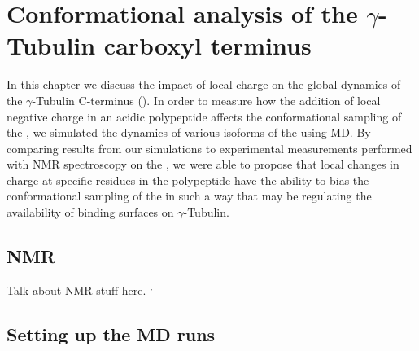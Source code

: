 \chapter{Conformational analysis of the $\gamma$-Tubulin carboxyl terminus}

In this chapter we discuss the impact of local charge on the global dynamics of the $\gamma$-Tubulin C-terminus (\gct). In order to measure how the addition of local negative charge in an acidic polypeptide affects the conformational sampling of the \gct, we simulated the dynamics of various isoforms of the \gct using MD. By comparing results from our simulations to experimental measurements performed with NMR spectroscopy on the \gct, we were able to propose that local changes in charge at specific residues in the polypeptide have the ability to bias the conformational sampling of the \gct in such a way that may be regulating the availability of binding surfaces on $\gamma$-Tubulin.

\section{NMR}
Talk about NMR stuff here.
`
\section{Setting up the MD runs}


